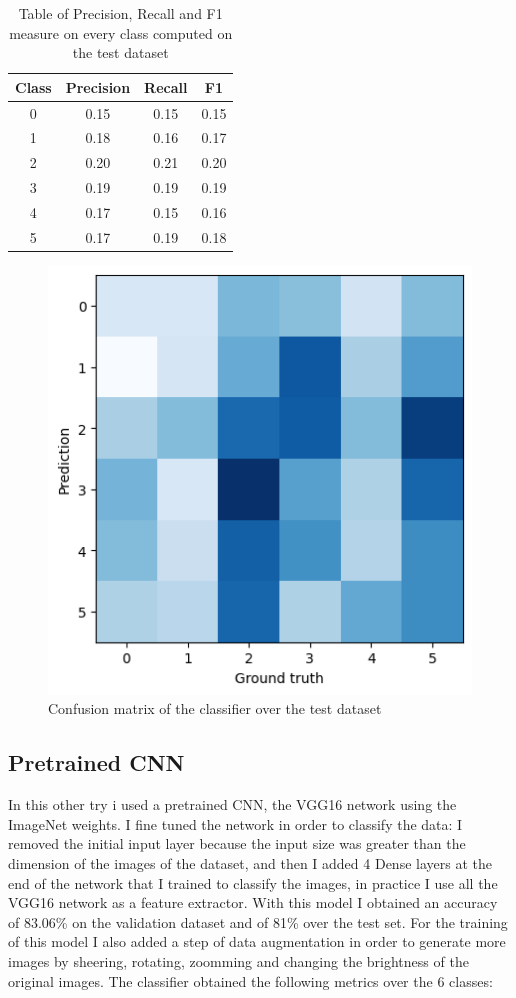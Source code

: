 \documentclass[12pt,journal,compsoc]{IEEEtran}
\begin{document}
\begin{table}[ht]
	\centering
	\begin{tabular}{c c c c }
		Class & Precision & Recall & F1  \\
		\hline
		0 & 0.15 &0.15 &0.15     \\
		1 & 0.18 &0.16 &0.17       \\
		2 & 0.20 &0.21 &0.20       \\
		3 & 0.19 &0.19 &0.19       \\ 
		4 & 0.17 &0.15 &0.16       \\
		5 & 0.17 &0.19 &0.18       \\
		
	\end{tabular}
	\caption{Table of Precision, Recall and F1 measure on every class computed on the test dataset}
	\end{table}
	\begin{figure}[H]
		\begin{center}
		\includegraphics[scale=.75]{./images/confmat_cnn.png}
		\end{center}
		\caption{Confusion matrix of the classifier over the test dataset}
	\end{figure}
\subsection{Pretrained CNN}
In this other try i used a pretrained CNN, the VGG16\cite{VGG16} network using the ImageNet weights. I fine tuned the network in order to classify the data: I removed the initial input layer because the input size was greater than the dimension of the images of the dataset, and then I added 4 Dense layers at the end of the network that I trained to classify the images, in practice I use all the VGG16 network as a feature extractor. With this model I obtained an accuracy of 83.06\% on the validation dataset and of 81\% over the test set.
For the training of this model I also added a step of data augmentation in order to generate more images by sheering, rotating, zoomming and changing the brightness of the original images.
The classifier obtained the following metrics over the 6 classes:
\end{document}
